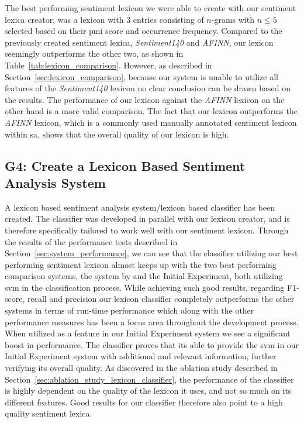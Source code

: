 The best performing sentiment lexicon we were able to create with our sentiment lexica creator, was a lexicon with 3 entries consisting of $n$-grams with $n\leq5$ selected based on their \ac{pmi} score and occurrence frequency. Compared to the previously created sentiment lexica, \textit{Sentiment140} and \textit{AFINN}, our lexicon seemingly outperforms the other two, as shown in Table~\ref{tab:lexicon_comparison}. However, as described in Section~\ref{sec:lexicon_comparison}, because our system is unable to utilize all features of the \textit{Sentiment140} lexicon no clear conclusion can be drawn based on the results. The performance of our lexicon against the \textit{AFINN} lexicon on the other hand is a more valid comparison. The fact that our lexicon outperforms the \textit{AFINN} lexicon, which is a commonly used manually annotated sentiment lexicon within \ac{sa}, shows that the overall quality of our lexicon is high.  

\subsection*{G4: Create a Lexicon Based Sentiment Analysis System}
A lexicon based sentiment analysis system/lexicon based classifier has been created. The classifier was developed in parallel with our lexicon creator, and is therefore specifically tailored to work well with our sentiment lexicon. Through the results of the performance tests described in Section~\ref{sec:system_performance}, we can see that the classifier utilizing our best performing sentiment lexicon almost keeps up with the two best performing comparison systems, the system by \citeauthor{FaretReitan} and the Initial Experiment, both utilizing \ac{svm} in the classification process. While achieving such good results, regarding F1-score, recall and precision our lexicon classifier completely outperforms the other systems in terms of run-time performance which along with the other performance measures has been a focus area throughout the development process. \\

When utilized as a feature in our Initial Experiment system we see a significant boost in performance. The classifier proves that its able to provide the \ac{svm} in our Initial Experiment system with additional and relevant information, further verifying its overall quality. As discovered in the ablation study described in Section~\ref{sec:ablation_study_lexicon_classifier}, the performance of the classifier is highly dependent on the quality of the lexicon it uses, and not so much on its different features. Good results for our classifier therefore also point to a high quality sentiment lexica.


